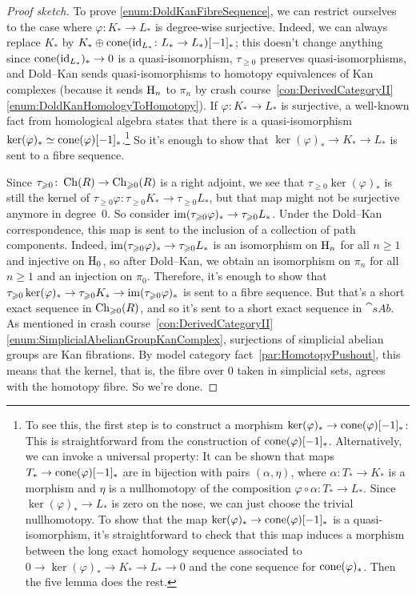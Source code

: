 \begin{proof}[Proof sketch]
	To prove \cref{enum:DoldKanFibreSequence}, we can restrict ourselves to the case where $\varphi\colon K_*\rightarrow L_*$ is degree-wise surjective. Indeed, we can always replace $K_*$ by $K_*\oplus \operatorname{cone}(\operatorname{id}_{L_*}\colon L_*\rightarrow L_*)[-1]_*$; this doesn't change anything since $\operatorname{cone}(\operatorname{id}_{L_*})_*\rightarrow 0$ is a quasi-isomorphism, $\tau_{\geqslant 0}$ preserves quasi-isomorphisms, and Dold--Kan sends quasi-isomorphisms to homotopy equivalences of Kan complexes (because it sends $\mathrm{H}_n$ to $\pi_n$ by crash course~\cref{con:DerivedCategoryII}\cref{enum:DoldKanHomologyToHomotopy}). If $\varphi\colon K_*\rightarrow L_*$ is surjective, a well-known fact from homological algebra states that there is a quasi-isomorphism $\ker(\varphi)_*\simeq \operatorname{cone}(\varphi)[-1]_*$.\footnote{To see this, the first step is to construct a morphism $\ker(\varphi)_*\rightarrow \operatorname{cone}(\varphi)[-1]_*$: This is straightforward from the construction of $\operatorname{cone}(\varphi)[-1]_*$. Alternatively, we can invoke a universal property: It can be shown that maps $T_*\rightarrow \operatorname{cone}(\varphi)[-1]_*$ are in bijection with pairs $(\alpha,\eta)$, where $\alpha\colon T_*\rightarrow K_*$ is a morphism and $\eta$ is a nullhomotopy of the composition $\varphi\circ\alpha\colon T_*\rightarrow L_*$. Since $\ker(\varphi)_*\rightarrow L_*$ is zero on the nose, we can just choose the trivial nullhomotopy. To show that the map $\ker(\varphi)_*\rightarrow \operatorname{cone}(\varphi)[-1]_*$ is a quasi-isomorphism, it's straightforward to check that this map induces a morphism between the long exact homology sequence associated to $0\rightarrow \ker(\varphi)_*\rightarrow K_*\rightarrow L_*\rightarrow 0$ and the cone sequence for $\operatorname{cone}(\varphi)_*$. Then the five lemma does the rest.} So it's enough to show that $\ker(\varphi)_*\rightarrow K_*\rightarrow L_*$ is sent to a fibre sequence.
	
	Since $\tau_{\geqslant 0}\colon \operatorname{Ch}(R)\rightarrow\operatorname{Ch}_{\geqslant 0}(R)$ is a right adjoint, we see that $\tau_{\geqslant 0}\ker(\varphi)_*$ is still the kernel of $\tau_{\geqslant 0}\varphi\colon \tau_{\geqslant 0}K_*\rightarrow \tau_{\geqslant 0}L_*$, but that map might not be surjective anymore in degree~$0$. So consider $\operatorname{im}(\tau_{\geqslant 0}\varphi)_*\rightarrow \tau_{\geqslant 0}L_*$.  Under the Dold--Kan correspondence, this map is sent to the inclusion of a collection of path components. Indeed, $\operatorname{im}(\tau_{\geqslant 0}\varphi)_*\rightarrow \tau_{\geqslant 0}L_*$ is an isomorphism on $\mathrm{H}_n$ for all $n\geqslant 1$ and injective on $\mathrm{H}_0$, so after Dold--Kan, we obtain an isomorphism on $\pi_n$ for all $n\geqslant 1$ and an injection on $\pi_0$. Therefore, it's enough to show that $\tau_{\geqslant 0}\ker(\varphi)_*\rightarrow \tau_{\geqslant 0}K_*\rightarrow \operatorname{im}(\tau_{\geqslant 0}\varphi)_*$ is sent to a fibre sequence. But that's a short exact sequence in $\operatorname{Ch}_{\geqslant 0}(R)$, and so it's sent to a short exact sequence in $\cat{sAb}$. As mentioned in crash course~\cref{con:DerivedCategoryII}\cref{enum:SimplicialAbelianGroupKanComplex}, surjections of simplicial abelian groups are Kan fibrations. By model category fact~\cref{par:HomotopyPushout}, this means that the kernel, that is, the fibre over $0$ taken in simplicial sets, agrees with the homotopy fibre. So we're done.
\end{proof}
